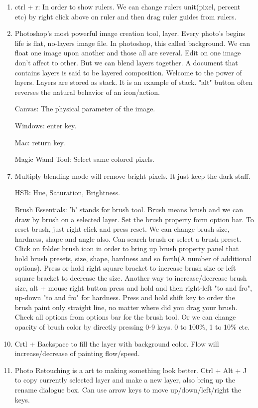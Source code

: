\documentclass[11 pt]{article}
\begin{document}
\begin{enumerate}
	\item ctrl + r: In order to show rulers. We can change rulers unit(pixel, percent etc) by right click above on ruler and then drag ruler guides from rulers.
	\item Photoshop's most powerful image creation tool, layer. Every photo's begins life is flat, no-layers image file. In photoshop, this called background. We can float one image upon another and those all are several. Edit on one image don't affect to other. But we can blend layers together. A document that contains layers is said to be layered composition. Welcome to the power of layers. Layers are stored as stack. It is an example of stack. "alt" button often reverses the natural behavior of an icon/action.
	\item[Canvas:] The physical parameter of the image.
	\item[Windows:] enter key.
	\item[Mac:] return key.
	\item[Magic Wand Tool:] Select same colored pixels.
	\item Multiply blending mode will remove bright pixels. It just keep the dark staff.
	\item[HSB:] Hue, Saturation, Brightness.
	\item[Brush Essentials:] 'b' stands for brush tool. Brush means brush and we can draw by brush on a selected layer. Set the brush property form option bar. To reset brush, just right click and press reset. We can change brush size, hardness, shape and angle also. Can search brush or select a brush preset. Click on folder brush icon in order to bring up brush property panel that hold brush presets, size, shape, hardness and so forth(A number of additional options). Press or hold right square bracket to increase brush size or left square bracket to decrease the size. Another way to increase/decrease brush size, alt + mouse right button press and hold and then right-left "to and fro", up-down "to and fro" for hardness. Press and hold shift key to order the brush paint only straight line, no matter where did you drag your brush. Check all options from options bar for the brush tool. Or we can change opacity of brush color by directly pressing 0-9 keys. 0 to 100\%, 1 to 10\% etc.
	\item Crtl + Backspace to fill the layer with background color. Flow will increase/decrease of painting flow/speed.
	\item Photo Retouching is a art to making something look better. Ctrl + Alt + J to copy currently selected layer and make a new layer, also bring up the rename dialogue box. Can use arrow keys to move up/down/left/right the keys.

\end{enumerate}
\end{document}
